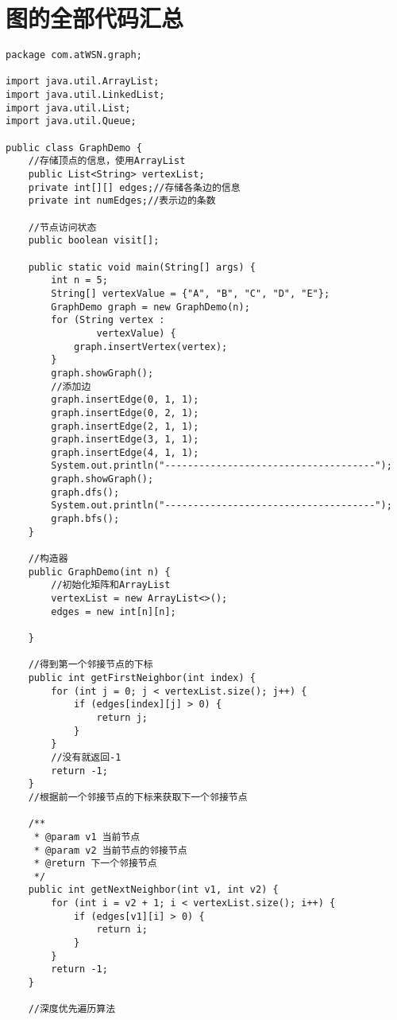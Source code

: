 \documentclass[a4paper]{report}
\begin{document}
\section{图的全部代码汇总}
\begin{lstlisting}
package com.atWSN.graph;

import java.util.ArrayList;
import java.util.LinkedList;
import java.util.List;
import java.util.Queue;

public class GraphDemo {
    //存储顶点的信息，使用ArrayList
    public List<String> vertexList;
    private int[][] edges;//存储各条边的信息
    private int numEdges;//表示边的条数

    //节点访问状态
    public boolean visit[];

    public static void main(String[] args) {
        int n = 5;
        String[] vertexValue = {"A", "B", "C", "D", "E"};
        GraphDemo graph = new GraphDemo(n);
        for (String vertex :
                vertexValue) {
            graph.insertVertex(vertex);
        }
        graph.showGraph();
        //添加边
        graph.insertEdge(0, 1, 1);
        graph.insertEdge(0, 2, 1);
        graph.insertEdge(2, 1, 1);
        graph.insertEdge(3, 1, 1);
        graph.insertEdge(4, 1, 1);
        System.out.println("-------------------------------------");
        graph.showGraph();
        graph.dfs();
        System.out.println("-------------------------------------");
        graph.bfs();
    }

    //构造器
    public GraphDemo(int n) {
        //初始化矩阵和ArrayList
        vertexList = new ArrayList<>();
        edges = new int[n][n];

    }

    //得到第一个邻接节点的下标
    public int getFirstNeighbor(int index) {
        for (int j = 0; j < vertexList.size(); j++) {
            if (edges[index][j] > 0) {
                return j;
            }
        }
        //没有就返回-1
        return -1;
    }
    //根据前一个邻接节点的下标来获取下一个邻接节点

    /**
     * @param v1 当前节点
     * @param v2 当前节点的邻接节点
     * @return 下一个邻接节点
     */
    public int getNextNeighbor(int v1, int v2) {
        for (int i = v2 + 1; i < vertexList.size(); i++) {
            if (edges[v1][i] > 0) {
                return i;
            }
        }
        return -1;
    }

    //深度优先遍历算法


\end{lstlisting}
\end{document}
